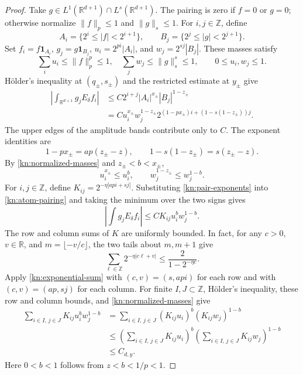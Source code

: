 \documentclass[11pt]{article}
\numberwithin{equation}{section}
\newcommand{\R}{\mathbb{R}}
\newcommand{\norm}[1]{\lVert #1\rVert}
\begin{document}
\begin{proof}
Take \(g\in L^1(\R^{d+1})\cap L^s(\R^{d+1})\). The pairing is
zero if \(f=0\) or \(g=0\); otherwise normalize
\(\norm{f}_p\le1\) and \(\norm{g}_s\le1\).
For \(i,j\in\mathbb Z\), define
\[
 A_i=\{2^i\le |f|<2^{i+1}\},\qquad
 B_j=\{2^j\le |g|<2^{j+1}\}.
\]
Set \(f_i=f\mathbf 1_{A_i}\), \(g_j=g\mathbf 1_{B_j}\),
\(u_i=2^{pi}|A_i|\), and \(w_j=2^{sj}|B_j|\). These masses satisfy
\begin{equation}\label{kn:normalized-masses}
 \sum_i u_i\le\norm f_p^p\le1,\quad
 \sum_j w_j\le\norm g_s^s\le1,
 \qquad 0\le u_i,w_j\le1.
\end{equation}
H\"older's inequality at \((q_\pm,s_\pm)\) and the restricted estimate
at \(y_\pm\) give
\begin{equation}\label{kn:atom-pairing}
 \begin{split}
 \left|\int_{\R^{d+1}}g_j E_\delta f_i\right|
 &\le C 2^{i+j}|A_i|^{x_\pm}|B_j|^{1-z_\pm}\\
 &= C u_i^{x_\pm}w_j^{1-z_\pm}
     2^{(1-p x_\pm)i+(1-s(1-z_\pm))j}.
 \end{split}
\end{equation}
The upper edges of the amplitude bands contribute only to \(C\).
The exponent identities are
\begin{equation}\label{kn:pair-exponents}
 1-px_\pm=ap(z_\pm-z),\qquad
 1-s(1-z_\pm)=s(z_\pm-z).
\end{equation}
By \eqref{kn:normalized-masses} and \(z_\pm<b<x_\pm\),
\[
 u_i^{x_\pm}\le u_i^b,\qquad
 w_j^{1-z_\pm}\le w_j^{1-b}.
\]
For \(i,j\in\mathbb Z\), define
\(K_{ij}=2^{-\eta|ap i+s j|}\). Substituting
\eqref{kn:pair-exponents} into \eqref{kn:atom-pairing} and taking
the minimum over the two signs gives
\begin{equation}\label{kn:decaying-pairing}
 \left|\int g_j E_\delta f_i\right|
 \le C K_{ij}u_i^b w_j^{1-b}.
\end{equation}
The row and column sums of \(K\) are uniformly bounded. In fact, for
any \(c>0\), \(v\in\R\), and \(m=\lfloor-v/c\rfloor\), the
two tails about \(m,m+1\) give
\begin{equation}\label{kn:exponential-sum}
 \sum_{\ell\in\mathbb Z} 2^{-\eta|c\ell+v|}
 \le \frac{2}{1-2^{-\eta c}}.
\end{equation}
Apply \eqref{kn:exponential-sum} with \((c,v)=(s,ap i)\) for each
row and with \((c,v)=(ap,s j)\) for each column. For finite
\(I,J\subset\mathbb Z\), H\"older's inequality, these row and column
bounds, and \eqref{kn:normalized-masses} give
\begin{equation}\label{kn:matrix-pairing}
 \begin{split}
 \sum_{i\in I,\,j\in J}K_{ij}u_i^b w_j^{1-b}
 &=\sum_{i\in I,\,j\in J}(K_{ij}u_i)^b(K_{ij}w_j)^{1-b}\\
 &\le \left(\sum_{i\in I,\,j\in J}K_{ij}u_i\right)^b
     \left(\sum_{i\in I,\,j\in J}K_{ij}w_j\right)^{1-b}\\
 &\le C_{d,y}.
 \end{split}
\end{equation}
Here \(0<b<1\) follows from \(z<b<1/p<1\).


\end{proof}
\end{document}
